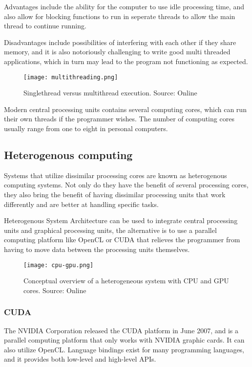 Advantages include the ability for the computer to use idle processing time, and also allow for blocking functions to run in seperate threads to allow the main thread to continue running.

Disadvantages include possibilities of interfering with each other if they share memory, and it is also notoriously challenging to write good multi threaded applications, which in turn may lead to the program not functioning as expected.

\begin{figure}[ht]
    \centering
    \texttt{[image: multithreading.png]}
    \caption{Singlethread versus multithread execution. Source: Online \citet{multithreadingcpp15}}
    \label{fig:multithreading}
\end{figure}
\FloatBarrier

Modern central processing units contains several computing cores, which can run their own threads if the programmer wishes. The number of computing cores usually range from one to eight in personal computers.

\subsection{Heterogenous computing}
Systems that utilize dissimilar processing cores are known as heterogenous computing systems. Not only do they have the benefit of several processing cores, they also bring the benefit of having dissimilar processing units that work differently and are better at handling specific tasks.

Heterogenous System Architecture can be used to integrate central processing units and graphical processing units, the alternative is to use a parallel computing platform like OpenCL or CUDA that relieves the programmer from having to move data between the processing units themselves.

\begin{figure}[ht]
    \centering
    \texttt{[image: cpu-gpu.png]}
    \caption{Conceptual overview of a heterogeneous system with CPU and GPU cores. Source: Online \citet{cpugpu13}}
    \label{fig:cpu-gpu.png}
\end{figure}
\FloatBarrier

\subsubsection{CUDA}
The NVIDIA Corporation released the CUDA platform in June 2007, and is a parallel computing platform that only works with NVIDIA graphic cards. It can also utilize OpenCL. Language bindings exist for many programming languages, and it provides both low-level and high-level APIs.

